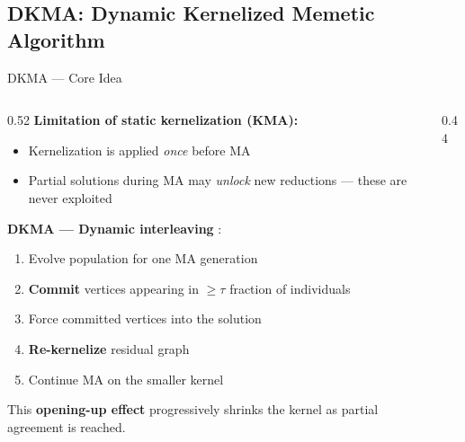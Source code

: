 \documentclass[aspectratio=169,10pt]{beamer}
\newcommand{\highlight}[1]{\textcolor{midblue}{\textbf{#1}}}
\begin{document}
\subsection{DKMA: Dynamic Kernelized Memetic Algorithm}

\begin{frame}{DKMA — Core Idea}
  \begin{columns}[T]
    \begin{column}{0.52\textwidth}
      \textbf{Limitation of static kernelization (KMA):}
      \begin{itemize}
        \item Kernelization is applied \emph{once} before MA
        \item Partial solutions during MA may \emph{unlock} new reductions —
          these are never exploited
      \end{itemize}
      \vspace{4pt}
      \textbf{DKMA — Dynamic interleaving} \cite{pace2022,esa2022}:
      \begin{enumerate}\setlength\itemsep{2pt}
        \item Evolve population for one MA generation
        \item \highlight{Commit} vertices appearing in $\ge \tau$ fraction of individuals
        \item Force committed vertices into the solution
        \item \highlight{Re-kernelize} residual graph
        \item Continue MA on the smaller kernel
      \end{enumerate}
      \vspace{4pt}
      This \textbf{opening-up effect} progressively shrinks the kernel
      as partial agreement is reached.
    \end{column}
    \begin{column}{0.44\textwidth}
\end{column}
\end{columns}
\end{frame}
\end{document}
